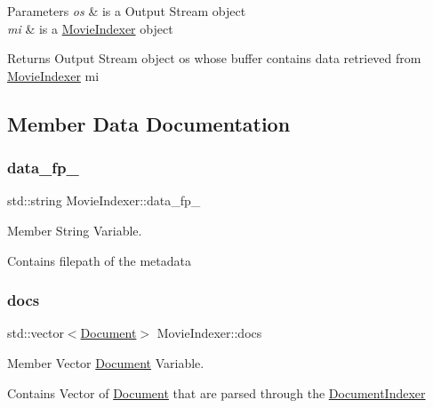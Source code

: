\begin{DoxyParams}{Parameters}
{\em os} & is a Output Stream object \\
\hline
{\em mi} & is a \hyperlink{class_movie_indexer}{Movie\+Indexer} object \\
\hline
\end{DoxyParams}
\begin{DoxyReturn}{Returns}
Output Stream object os whose buffer contains data retrieved from \hyperlink{class_movie_indexer}{Movie\+Indexer} mi 
\end{DoxyReturn}


\subsection{Member Data Documentation}
\mbox{\label{class_movie_indexer_ae7694a6ed8890793145c43a6d66817b3}} 
\subsubsection{\texorpdfstring{data\+\_\+fp\+\_\+}{data\_fp\_}}
{\footnotesize\ttfamily std\+::string Movie\+Indexer\+::data\+\_\+fp\+\_\+\hspace{0.3cm}{\ttfamily [private]}}



Member String Variable. 

Contains filepath of the metadata \mbox{\label{class_movie_indexer_ae931ceafb1dac1d376c85d37d89a1e8f}} 
\subsubsection{\texorpdfstring{docs}{docs}}
{\footnotesize\ttfamily std\+::vector$<$\hyperlink{class_document}{Document}$>$ Movie\+Indexer\+::docs\hspace{0.3cm}{\ttfamily [private]}}



Member Vector \hyperlink{class_document}{Document} Variable. 

Contains Vector of \hyperlink{class_document}{Document} that are parsed through the \hyperlink{class_document_indexer}{Document\+Indexer} \mbox{\label{class_movie_indexer_a65c1c95748e5aabd897f13addd1de8a1}} 
